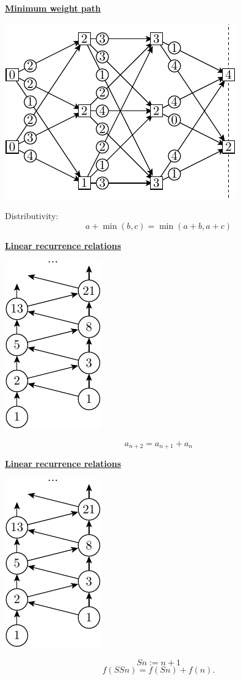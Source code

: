 \documentclass[11pt]{article}
\def\heading #1{\centerline{\underline{\bf\LARGE #1}}}
\def\vsp {\vskip 0.5cm}
\begin{document}
\newpage %

\heading{Minimum weight path}
\centerline{\includegraphics[]{pic-minpath-4.pdf}}

Distributivity:
$$
    a + \min(b, c) = \min(a+b, a+c)
$$


\newpage %

\heading{Linear recurrence relations}

\vsp
\centerline{\includegraphics[]{pic-fibonacci.pdf}}
$$
    a_{n+2} = a_{n+1} + a_n
$$



\newpage %

\heading{Linear recurrence relations}

\vsp
\centerline{\includegraphics[]{pic-fibonacci.pdf}}
$$
    Sn := n+1
$$
$$
    f(SSn) = f(Sn) + f(n).
$$



\newpage %
\end{document}
